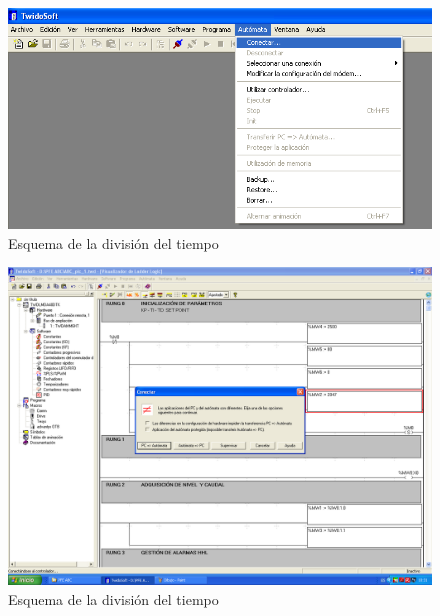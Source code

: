 \begin{figure}[ht!]
	\centering
	\includegraphics[scale=0.5]{Anexos/images/twidosoft.PNG}
	\caption{Esquema de la división del tiempo}
	\label{img:twidosoft}
\end{figure}

\begin{figure}[ht!]
	\centering
	\includegraphics[scale=0.3]{Anexos/images/twidosoftcargar.PNG}
	\caption{Esquema de la división del tiempo}
	\label{img:twidosoftcargar}
\end{figure}

